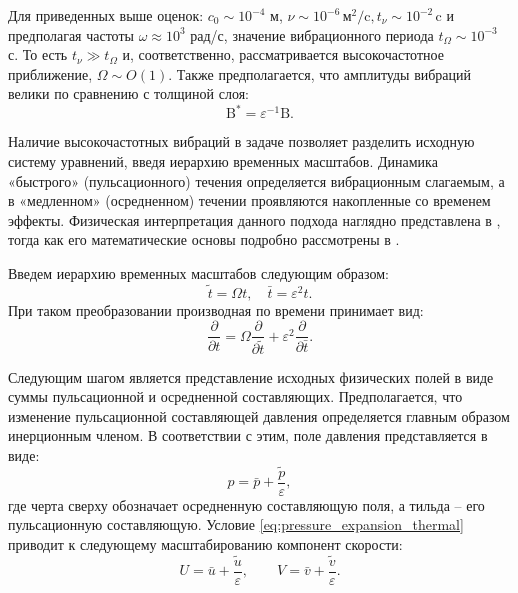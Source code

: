 \documentclass[12pt,a4paper]{article}
\begin{document}
Для приведенных выше оценок: $c_0\sim10^{-4} $ $\text{м}$, $\nu\sim10^{-6}\,\mathrm{\text{м}^2/\text{c}}, t_\nu\sim10^{-2}\,\text{c}$
и предполагая частоты $\omega \approx 10^3 $ рад/с, значение вибрационного периода
$t_\Omega\sim10^{-3}$ с.
То есть $t_\nu\gg t_\Omega$ и, соответственно, рассматривается высокочастотное приближение,
$\Omega\sim O(1)$.
Также предполагается, что амплитуды вибраций велики по сравнению с толщиной слоя:
\begin{equation} 
\mathrm{B^*}=\varepsilon^{-1 }\mathrm{B}.
\end{equation}

Наличие высокочастотных вибраций в задаче позволяет разделить исходную систему уравнений, введя иерархию временных масштабов. Динамика «быстрого» (пульсационного) течения определяется вибрационным слагаемым, а в «медленном» (осредненном) течении проявляются накопленные со временем эффекты. Физическая интерпретация данного подхода наглядно представлена в \cite{Kapitsa1951a, Kapitsa1951b, Gershuni1998}, тогда как его математические основы подробно рассмотрены в \cite{Nayfeh1984}.

Введем иерархию временных масштабов следующим образом:
\begin{equation}
	\tilde{t} = \Omega t, \quad \bar{t} = \varepsilon^2 t.
	\label{eq:timescale_hierarchy_thermal}
\end{equation}
При таком преобразовании производная по времени принимает вид:
\begin{equation}
	\frac{\partial}{\partial t}
	=
	\Omega \frac{\partial}{\partial \tilde{t}}
	+
	\varepsilon^2 \frac{\partial}{\partial \bar{t}}.
	\label{eq:time_derivative_expansion_thermal}
\end{equation}

Следующим шагом является представление исходных физических полей в виде суммы пульсационной и осредненной составляющих. Предполагается, что изменение пульсационной составляющей давления определяется главным образом инерционным членом. В соответствии с этим, поле давления представляется в виде:
\begin{equation}
	p = \bar{p} + \frac{\tilde{p}}{\varepsilon},
	\label{eq:pressure_expansion_thermal}
\end{equation}
где черта сверху обозначает осредненную составляющую поля, а тильда -- его пульсационную составляющую. Условие \eqref{eq:pressure_expansion_thermal} приводит к следующему масштабированию компонент скорости:
\begin{equation}
	U = \bar{u} + \frac{\tilde{u}}{\varepsilon},
	\qquad
	V = \bar{v} + \frac{\tilde{v}}{\varepsilon}.
	\label{eq:velocity_scaling_thermal}
\end{equation}
\end{document}
